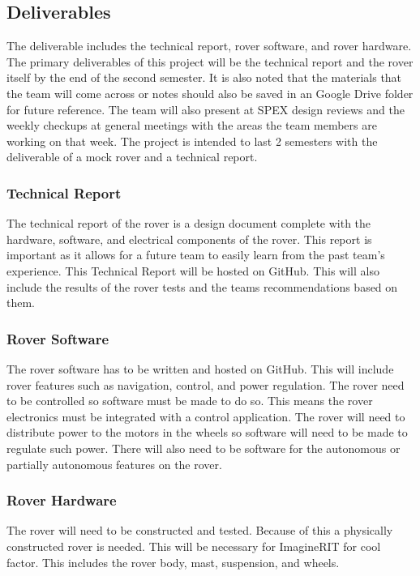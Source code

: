 \documentclass[conference]{IEEEtran} %
\begin{document}
\subsection{Deliverables}
\label{subsec:deliverables}
The deliverable includes the technical report, rover software, and rover hardware.
The primary deliverables of this project will be the technical report and the rover itself by the end of the second semester.
It is also noted that the materials that the team will come across or notes should also be saved in an Google Drive folder for future reference. 
The team will also present at SPEX design reviews and the weekly checkups at general meetings with the areas the team members are working on that week.
The project is intended to last 2 semesters with the deliverable of a mock rover and a technical report.   

\subsubsection{Technical Report}
\label{techreport}
The technical report of the rover is a design document complete with the hardware, software, and electrical components of the rover. 
This report is important as it allows for a future team to easily learn from the past team's experience. 
This Technical Report will be hosted on GitHub. 
This will also include the results of the rover tests and the teams recommendations based on them. 

\subsubsection{Rover Software}
\label{roversoftware}
The rover software has to be written and hosted on GitHub. 
This will include rover features such as navigation, control, and power regulation. 
The rover need to be controlled so software must be made to do so. 
This means the rover electronics must be integrated with a control application. 
The rover will need to distribute power to the motors in the wheels so software will need to be made to regulate such power. 
There will also need to be software for the autonomous or partially autonomous features on the rover. 

\subsubsection{Rover Hardware}
\label{roverhardware}
The rover will need to be constructed and tested. Because of this a physically constructed rover is needed. This will be necessary for ImagineRIT for cool factor. This includes the rover body, mast, suspension, and wheels. 
\end{document}
